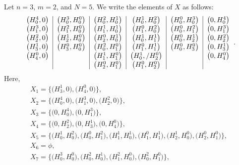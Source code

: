 \documentclass[pdftex]{sigma}
\numberwithin{equation}{section}
\begin{document}
\begin{Example}%

Let $n=3$, $m=2$, and $N=5$. We write the elements of $X$ as follows:
\[
\begin{tabular}{c|c|c|c|c|c}
$\bigl(H^{4}_{0},0\bigr)$ & $\bigl(H^{3}_{0},H^{0}_{0}\bigr)$ & $\bigl(H^{2}_{0},H^{1}_{0}\bigr)$ & $\bigl(H^{1}_{0},H^{2}_{0}\bigr)$ & $\bigl(H^{0}_{0},H^{3}_{0}\bigr)$ & $\bigl(0,H^{4}_{0}\bigr)$ \\[0.3mm]
$\bigl(H^{3}_{1},0\bigr)$ & $\bigl(H^{2}_{1},H^{0}_{0}\bigr)$ & $\bigl(H^{1}_{1},H^{1}_{0}\bigr)$ & $\bigl(H^{0}_{1},H^{2}_{0}\bigr)$ & $\bigl(H^{0}_{0},H^{2}_{1}\bigr)$ & $\bigl(0,H^{3}_{1}\bigr)$ \\[0.3mm]
$\bigl(H^{2}_{2},0\bigr)$ & $\bigl(H^{1}_{2},H^{0}_{0}\bigr)$ & $\bigl(H^{0}_{2},H^{1}_{0}\bigr)$ & $\bigl(H^{1}_{0},H^{1}_{1}\bigr)$ & $\bigl(H^{0}_{0},H^{1}_{2}\bigr)$ & $\bigl(0,H^{2}_{2}\bigr)$ \\[0.3mm]
$\bigl(H^{1}_{3},0\bigr)$ & $\bigl(H^{0}_{3},H^{0}_{0}\bigr)$ & $\bigl(H^{2}_{0},H^{0}_{1}\bigr)$ & $\bigl(H^{0}_{1},H^{1}_{1}\bigr)$ & $\bigl(H^{0}_{0},H^{0}_{3}\bigr)$ & $\bigl(0,H^{1}_{3}\bigr)$ \\[0.3mm]
$\bigl(H^{0}_{4},0\bigr)$ & & $\bigl(H^{1}_{1},H^{0}_{1}\bigr)$ & $\bigl(H^{1}_{0},/H^{0}_{2}\bigr)$ & & $\bigl(0,H^{0}_{4}\bigr)$ \\[0.3mm]
 & & $\bigl(H^{0}_{2},H^{0}_{1}\bigr)$ & $\bigl(H^{0}_{1},H^{0}_{2}\bigr)$ & &
\end{tabular}.
\]
Here,
\begin{gather*}
X_1=\bigl\{\bigl(H^{1}_{3},0\bigr), \bigl(H^{0}_{4},0\bigr)\bigr\},\\
X_2=\bigl\{\bigl(H^{4}_{0},0\bigr), \bigl(H^{3}_{1},0\bigr), \bigl(H^{2}_{2},0\bigr)\bigr\},\\
X_3=\bigl\{\bigl(0,H^{4}_{0}\bigr),\bigl(0,H^{3}_{1}\bigr)\bigr\},\\
X_4=\bigl\{\bigl(0,H^{2}_{2}\bigr),\bigl(0,H^{1}_{3}\bigr),\bigl(0,H^{0}_{4}\bigr)\bigr\},\\
X_5=\bigl\{\bigl(H^{1}_{0},H^{2}_{0}\bigr),\bigl(H^{0}_{0},H^{2}_{1}\bigr),\bigl(H^{1}_{1},H^{1}_{0}\bigr),\bigl(H^{0}_{1},H^{1}_{1}\bigr),\bigl(H^{1}_{2},H^{0}_{0}\bigr),\bigl(H^{0}_{2},H^{0}_{1}\bigr)\bigr\},\\
X_6=\phi, \\
X_7=\bigl\{\bigl(H^{3}_{0},H^{0}_{0}\bigr),\bigl(H^{2}_{0},H^{1}_{0}\bigr),\bigl(H^{2}_{1},H^{0}_{0}\bigr),\bigl(H^{2}_{0},H^{0}_{1}\bigr)\bigr\},\\

\end{gather*}
\end{Example}
\end{document}
